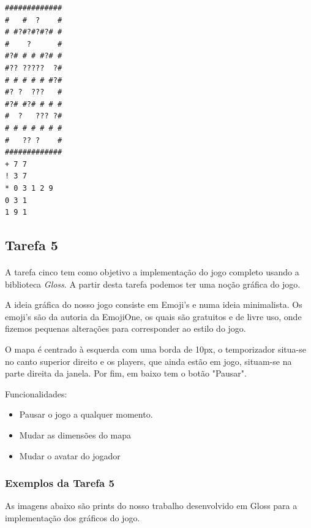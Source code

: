 \documentclass[a4paper]{article}
\begin{document}
\begin{verbatim}
#############
#   #  ?    #
# #?#?#?#?# #
#    ?      #
#?# # # #?# #
#?? ?????  ?#
# # # # # #?#
#? ?  ???   #
#?# #?# # # #
#  ?   ??? ?#
# # # # # # #
#   ?? ?    #
#############
+ 7 7
! 3 7
* 0 3 1 2 9
0 3 1
1 9 1
\end{verbatim}

\subsection{Tarefa 5}
\paragraph{} A tarefa cinco tem como objetivo a implementação do jogo completo usando a biblioteca \emph{Gloss}. A partir desta tarefa podemos ter uma noção gráfica do jogo.\par A ideia gráfica do nosso jogo consiste em Emoji's e numa ideia minimalista. Os emoji's são da autoria da EmojiOne, os quais são gratuitos e de livre uso, onde fizemos pequenas alterações para corresponder ao estilo do jogo.\par O mapa é centrado à esquerda com uma borda de 10px, o temporizador situa-se no canto superior direito e os players, que ainda estão em jogo, situam-se na parte direita da janela. Por fim, em baixo tem o botão "Pausar".\par Funcionalidades:

\begin{itemize}
      \item Pausar o jogo a qualquer momento.
      \item Mudar as dimensões do mapa
      \item Mudar o avatar do jogador
\end{itemize}

\subsubsection{Exemplos da Tarefa 5}

As imagens abaixo são prints do nosso trabalho desenvolvido em Gloss para a implementação dos gráficos do jogo.
\end{document}
